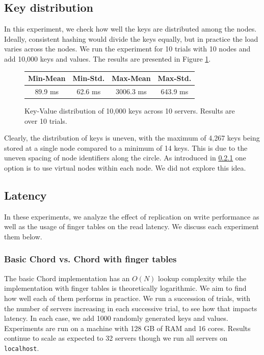 \documentclass{sig-alternate-10pt}
\begin{document}
\subsection{Key distribution}
In this experiment, we check how well the keys are distributed among the nodes. Ideally, consistent hashing would divide the keys equally, but in practice the load varies across the nodes. We run the experiment for 10 trials with 10 nodes and add 10,000 keys and values. The results are presented in Figure \ref{fig:keydist}.

\begin{figure}[hb]
  \centering
\begin{tabular}{ c | c | c | c }
  Min-Mean & Min-Std. & Max-Mean & Max-Std. \\
  \hline
  89.9 ms & 62.6 ms & 3006.3 ms & 643.9 ms \\
\end{tabular}
  \caption{Key-Value distribution of 10,000 keys across 10 servers.  Results are over 10 trials.}
  \label{fig:keydist}
\end{figure}

Clearly, the distribution of keys is uneven, with the maximum of 4,267 keys being stored at a single node compared to a minimum of 14 keys. This is due to the uneven spacing of node identifiers along the circle.  As introduced in \ref{} one option is to use virtual nodes within each node.  We did not explore this idea.

\subsection{Latency}
In these experiments, we analyze the effect of replication on write performance as well as the usage of finger tables on the read latency. We discuss each experiment them below.

\subsubsection{Basic Chord vs. Chord with finger tables}
The basic Chord implementation has an $O(N)$ lookup complexity while the implementation with finger tables is theoretically logarithmic. We aim to find how well each of them performs in practice. We run a succession of trials, with the number of servers increasing in each successive trial, to see how that impacts latency. In each case, we add 1000 randomly generated keys and values. Experiments are run on a machine with 128 GB of RAM and 16 cores. Results continue to scale as expected to 32 servers though we run all servers on \verb|localhost|.
\end{document}
